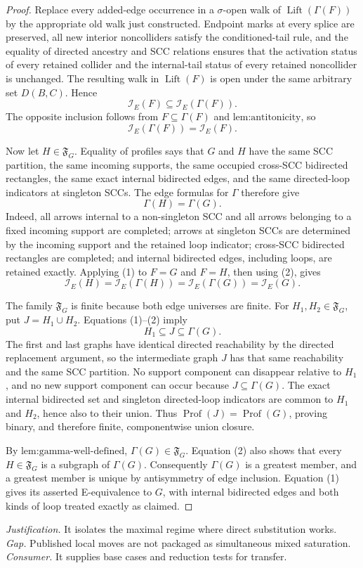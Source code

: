 \documentclass{article}
\begin{document}
\begin{proof}
Replace every added-edge occurrence in a \(\sigma\)-open walk of \(\operatorname{Lift}(\Gamma(F))\) by the appropriate old walk just constructed.  Endpoint marks at every splice are preserved, all new interior noncolliders satisfy the conditioned-tail rule, and the equality of directed ancestry and SCC relations ensures that the activation status of every retained collider and the internal-tail status of every retained noncollider is unchanged.  The resulting walk in \(\operatorname{Lift}(F)\) is open under the same arbitrary set \(D(B,C)\).  Hence
\[
\mathcal I_E(F)\subseteq\mathcal I_E(\Gamma(F)).
\]
The opposite inclusion follows from \(F\subseteq\Gamma(F)\) and \(\text{lem:antitonicity}\), so
\[
\mathcal I_E(\Gamma(F))=\mathcal I_E(F).
\tag{1}
\]

Now let \(H\in\mathfrak F_G\).  Equality of profiles says that \(G\) and \(H\) have the same SCC partition, the same incoming supports, the same occupied cross-SCC bidirected rectangles, the same exact internal bidirected edges, and the same directed-loop indicators at singleton SCCs.  The edge formulas for \(\Gamma\) therefore give
\[
\Gamma(H)=\Gamma(G).
\tag{2}
\]
Indeed, all arrows internal to a non-singleton SCC and all arrows belonging to a fixed incoming support are completed; arrows at singleton SCCs are determined by the incoming support and the retained loop indicator; cross-SCC bidirected rectangles are completed; and internal bidirected edges, including loops, are retained exactly.  Applying (1) to \(F=G\) and \(F=H\), then using (2), gives
\[
\mathcal I_E(H)=\mathcal I_E(\Gamma(H))
=\mathcal I_E(\Gamma(G))=\mathcal I_E(G).
\]

The family \(\mathfrak F_G\) is finite because both edge universes are finite.  For \(H_1,H_2\in\mathfrak F_G\), put \(J=H_1\cup H_2\).  Equations (1)--(2) imply
\[
H_1\subseteq J\subseteq\Gamma(G).
\]
The first and last graphs have identical directed reachability by the directed replacement argument, so the intermediate graph \(J\) has that same reachability and the same SCC partition.  No support component can disappear relative to \(H_1\), and no new support component can occur because \(J\subseteq\Gamma(G)\).  The exact internal bidirected set and singleton directed-loop indicators are common to \(H_1\) and \(H_2\), hence also to their union.  Thus \(\operatorname{Prof}(J)=\operatorname{Prof}(G)\), proving binary, and therefore finite, componentwise union closure.

By \(\text{lem:gamma-well-defined}\), \(\Gamma(G)\in\mathfrak F_G\).  Equation (2) also shows that every \(H\in\mathfrak F_G\) is a subgraph of \(\Gamma(G)\).  Consequently \(\Gamma(G)\) is a greatest member, and a greatest member is unique by antisymmetry of edge inclusion.  Equation (1) gives its asserted E-equivalence to \(G\), with internal bidirected edges and both kinds of loop treated exactly as claimed.
\end{proof}
\par\smallskip\noindent \textit{Justification.} It isolates the maximal regime where direct substitution works. \textit{Gap.} Published local moves are not packaged as simultaneous mixed saturation. \textit{Consumer.} It supplies base cases and reduction tests for transfer.
\end{document}
